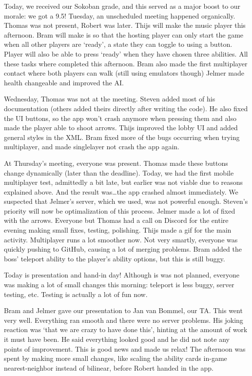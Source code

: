 \documentclass[../main.tex]{subfiles}
\begin{document}
Today, we received our Sokoban grade, and this served as a major boost to our morale: we got a 9.5! 
\bigbreak\noindent
Tuesday, an unscheduled meeting happened organically. Thomas was not present, Robert was later. Thijs will make the music player this afternoon. Bram will make is so that the hosting player can only start the game when all other players are `ready', a state they can toggle to using a button. Player will also be able to press `ready' when they have chosen three abilities. All these tasks where completed this afternoon. Bram also made the first multiplayer contact where both players can walk (still using emulators though) Jelmer made health changeable and improved the AI.

\bigbreak\noindent
Wednesday, Thomas was not at the meeting. Steven added most of his documentation (others added theirs directly after writing the code). He also fixed the UI buttons, so the app won't crash anymore when pressing them and also made the player able to shoot arrows. Thijs improved the lobby UI and added general styles in the XML. Bram fixed more of the bugs occurring when trying multiplayer, and made singlelayer not crash the app again. 

\bigbreak\noindent
At Thursday's meeting, everyone was present. Thomas made these buttons change dynamically (later than the deadline). Today, we had the first mobile multiplayer test, admittedly a bit late, but earlier was not viable due to reasons explained above. And the result was\dots the app crashed almost immediately. We suspected that Jelmer's server, which we used, was not powerful enough. Steven's priority will now be optimalization of this process. Jelmer made a lot of  fixed with the arrows. Everyone but Thomas had a call on Discord for the entire evening making small fixes, testing, polishing. Thijs made a gif for the main activity. Multiplayer runs a lot smoother now. Not very smartly, everyone was quickly pushing to GitHub, causing a lot of merging problems. Bram added the boss' teleport ability to the player's ability options, but this is still buggy.

\bigbreak\noindent
Today is presentation and hand-in day! Although is was not planned, everyone was making a lot of small changes this morning: teleport is less buggy, server testing, etc. Testing is actually a lot of fun now.

Bram and Jelmer gave our presentation to Jan van Bommel, our TA. This went very well. Everything ran smooth and there were no server problems. His joking reaction was `that we are crazy to have done this', hinting at the amount of work it must have been. He said everything looked good and he did not note any points of improvement. This is good news and made us relax! The afternoon was spent by making more small changes, like scaling the ability cards in-game nearest-neighbor instead of bilinear, before Robert handed in the app.
\end{document}
